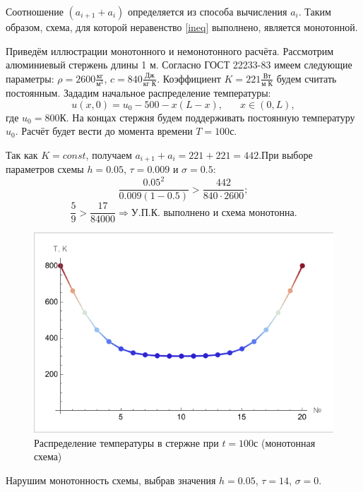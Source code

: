 \documentclass[12pt, a4paper]{article}
\begin{document}
Соотношение $(a_{i+1}+a_i)$ определяется из способа вычисления $a_i$. Таким образом, схема, для которой неравенство \eqref{ineq} выполнено, является монотонной.

Приведём иллюстрации монотонного и немонотонного расчёта. Рассмотрим алюминиевый стержень длины 1 м. Согласно ГОСТ 22233-83 имеем следующие параметры: $\rho = 2600\frac{\text{кг}}{\text{м}^3}$, $c = 840 \frac{\text{Дж}}{\text{кг К}}$. Коэффициент $K = 221\frac{\text{Вт}}{\text{м К}}$ будем считать постоянным. Зададим начальное распределение температуры:
\[
u(x, 0) = u_0-500-x(L-x), \phantom{xxx} x\in(0, L),
\]
где $u_0=800$К. На концах стержня будем поддерживать постоянную температуру $u_0$. Расчёт будет вести до момента времени $T=100$с. 

Так как $K=const$, получаем $a_{i+1}+a_i = 221 + 221 = 442$.При выборе параметров схемы $h=0.05$, $\tau = 0.009$ и $\sigma = 0.5$:
\[
\dfrac{0.05^2}{0.009(1-0.5)} > \dfrac{442}{840\cdot 2600};
\]
\[
\dfrac59 > \frac{17}{84000} \Rightarrow \text{У.П.К. выполнено и схема монотонна}.
\]

 \begin{figure}[H]
	\centering
	\includegraphics[width=1\textwidth]{monotExample}
	\caption{Распределение температуры в стержне при \mbox{$t=100$с} (монотонная схема)}
\end{figure}

\pagebreak

Нарушим монотонность схемы, выбрав значения $h=0.05$, $\tau = 14$, $\sigma = 0$.
\end{document}
